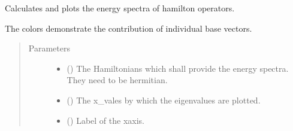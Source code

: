 \documentclass[letterpaper,10pt,english]{sphinxmanual}
\begin{document}
\begin{fulllineitems}
\label{\detokenize{qsim:qsim.energy_spectrum.plot_energy_spectrum}}
Calculates and plots the energy spectra of hamilton operators.

The colors demonstrate the contribution of individual base vectors.
\begin{quote}\begin{description}
\item[{Parameters}] \leavevmode\begin{itemize}
\item {} 
 () \textendash{} The Hamiltonians which shall provide the energy spectra. They need to
be hermitian.

\item {} 
 (\sphinxstyleliteralemphasis{\sphinxupquote{, }}\sphinxstyleliteralemphasis{\sphinxupquote{ (}}\sphinxstyleliteralemphasis{\sphinxupquote{, }}\sphinxstyleliteralemphasis{\sphinxupquote{)}}) \textendash{} The x\_vales by which the eigenvalues are plotted.

\item {} 
 () \textendash{} Label of the x\sphinxhyphen{}axis.

\end{itemize}

\end{description}\end{quote}

\end{fulllineitems}

\end{document}
